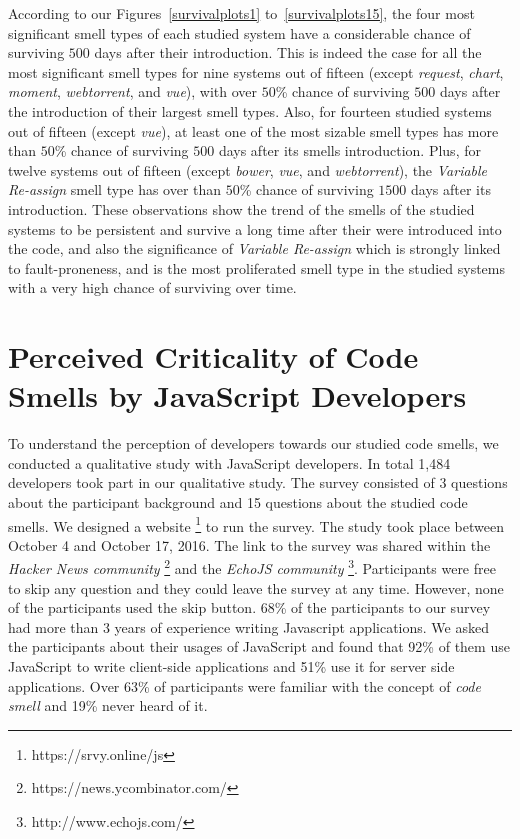 {According to our Figures~\ref{survivalplots1} to~\ref{survivalplots15}, the four most significant smell types of each studied system have a considerable chance of surviving $500$ days after their introduction. This is indeed the case for all the most significant smell types for nine systems out of fifteen (except \textsl{request}, \textsl{chart}, \textsl{moment}, \textsl{webtorrent}, and \textsl{vue}), with over $50$\% chance of surviving $500$ days after the introduction of their largest smell types. Also, for fourteen studied systems out of fifteen (except \textsl{vue}), at least one of the most sizable smell types has more than $50$\% chance of surviving $500$ days after its smells introduction. Plus, for twelve systems out of fifteen (except \textsl{bower}, \textsl{vue}, and \textsl{webtorrent}), the \textsl{Variable Re-assign} smell type has over than $50$\% chance of surviving $1500$ days after its introduction. These observations show the trend of the smells of the studied systems to be persistent and survive a long time after their were introduced into the code, and also the significance of \textsl{Variable Re-assign} which is strongly linked to fault-proneness, and is the most proliferated smell type in the studied systems with a very high chance of surviving over time.


}
\section{Perceived Criticality of Code Smells by JavaScript Developers}\label{survey}
To understand the perception of developers towards our studied code smells, we conducted a qualitative study with JavaScript developers. In total 1,484 developers took part in our qualitative study. The survey consisted of 3 questions about the participant background and 15 questions about the studied code smells. We designed a website \footnote{https://srvy.online/js} to run the survey. The study took place between October 4 and October 17, 2016. The link to the survey was shared within the \emph{Hacker News community} \footnote{https://news.ycombinator.com/} and the \emph{EchoJS community} \footnote{http://www.echojs.com/}. Participants were free to skip any question and they could leave the survey at any time. However, none of the participants used the skip button. 68\% of the participants to our survey had more than 3 years of experience writing Javascript applications. We asked the participants about their usages of JavaScript and found that 92\% of them use JavaScript to write client-side applications and 51\% use it for server side applications. Over 63\% of participants were familiar with the concept of \emph{code smell} and 19\% never heard of it.

